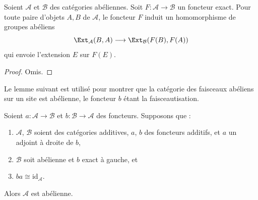 \begin{lemma}
\label{lemma-exact-functor-ext}
Soient $\mathcal{A}$ et $\mathcal{B}$ des catégories abéliennes.
Soit $F : \mathcal{A} \to \mathcal{B}$ un foncteur exact.
Pour toute paire d'objets $A, B$ de $\mathcal{A}$, le
foncteur $F$ induit un homomorphisme de groupes abéliens
$$
\Ext_\mathcal{A}(B, A)
\longrightarrow
\Ext_\mathcal{B}(F(B), F(A))
$$
qui envoie l'extension $E$ sur $F(E)$.
\end{lemma}

\begin{proof}
Omis.
\end{proof}

\noindent
Le lemme suivant est utilisé pour montrer que la catégorie des faisceaux
abéliens sur un site est abélienne, le foncteur $b$ étant la faisceautisation.

\begin{lemma}
\label{lemma-adjoint-get-abelian}
Soient $a : \mathcal{A} \to \mathcal{B}$ et $b : \mathcal{B} \to \mathcal{A}$
des foncteurs. Supposons que :
\begin{enumerate}
\item $\mathcal{A}$, $\mathcal{B}$ soient des catégories additives,
$a$, $b$ des foncteurs additifs, et $a$ un adjoint à droite de $b$,
\item $\mathcal{B}$ soit abélienne et $b$ exact à gauche, et
\item $ba \cong \text{id}_\mathcal{A}$.
\end{enumerate}
Alors $\mathcal{A}$ est abélienne.
\end{lemma}

